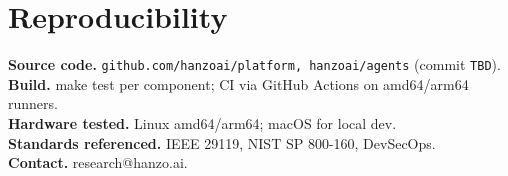 \documentclass[11pt,letterpaper]{article}
\begin{document}
\section*{Reproducibility}
\textbf{Source code.} \texttt{github.com/hanzoai/platform, hanzoai/agents} (commit \texttt{TBD}).\\
\textbf{Build.} make test per component; CI via GitHub Actions on amd64/arm64 runners.\\
\textbf{Hardware tested.} Linux amd64/arm64; macOS for local dev.\\
\textbf{Standards referenced.} IEEE 29119, NIST SP 800-160, DevSecOps.\\
\textbf{Contact.} research@hanzo.ai.
\end{document}

